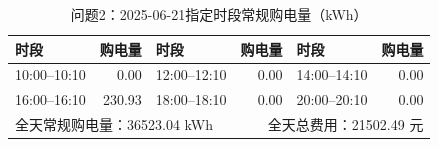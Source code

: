 \begin{table}[H]\centering\small
\caption{问题2：2025-06-21指定时段常规购电量（kWh）}
\label{tab:q2_0621_purchase}
\begin{tabular}{lrlrlr}\toprule
时段 & 购电量 & 时段 & 购电量 & 时段 & 购电量 \\\midrule
10:00--10:10 & 0.00 & 12:00--12:10 & 0.00 & 14:00--14:10 & 0.00 \\
16:00--16:10 & 230.93 & 18:00--18:10 & 0.00 & 20:00--20:10 & 0.00 \\
\midrule
\multicolumn{3}{l}{全天常规购电量：36523.04 kWh} & \multicolumn{3}{r}{全天总费用：21502.49 元}\\
\bottomrule\end{tabular}\end{table}
